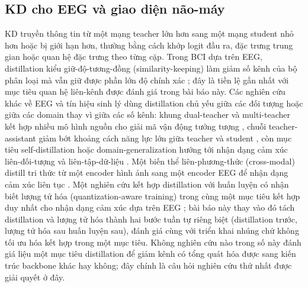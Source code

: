 \documentclass[11pt,a4paper,twoside,asymmetric]{article}
\begin{document}
\subsection{KD cho EEG và giao diện não-máy}
KD truyền thông tin từ một mạng teacher lớn hơn sang một mạng student nhỏ hơn hoặc bị giới hạn hơn, thường bằng cách khớp logit đầu ra, đặc trưng trung gian hoặc quan hệ đặc trưng theo từng cặp. Trong BCI dựa trên EEG, distillation kiểu giữ-độ-tương-đồng (similarity-keeping) làm giảm số kênh của bộ phân loại mà vẫn giữ được phần lớn độ chính xác \cite{R47}; đây là tiền lệ gần nhất với mục tiêu quan hệ liên-kênh được đánh giá trong bài báo này. Các nghiên cứu khác về EEG và tín hiệu sinh lý dùng distillation chủ yếu giữa các đối tượng hoặc giữa các domain thay vì giữa các số kênh: khung dual-teacher và multi-teacher kết hợp nhiều mô hình nguồn cho giải mã vận động tưởng tượng \cite{R49,R54}, chuỗi teacher-assistant giảm bớt khoảng cách năng lực lớn giữa teacher và student \cite{R53}, còn mục tiêu self-distillation hoặc domain-generalization hướng tới nhận dạng cảm xúc liên-đối-tượng và liên-tập-dữ-liệu \cite{R50,R52,R55,R57}. Một biến thể liên-phương-thức (cross-modal) distill tri thức từ một encoder hình ảnh sang một encoder EEG để nhận dạng cảm xúc liên tục \cite{R51}. Một nghiên cứu kết hợp distillation với huấn luyện có nhận biết lượng tử hóa (quantization-aware training) trong cùng một mục tiêu kết hợp duy nhất cho nhận dạng cảm xúc dựa trên EEG \cite{R56}; bài báo này thay vào đó tách distillation và lượng tử hóa thành hai bước tuần tự riêng biệt (distillation trước, lượng tử hóa sau huấn luyện sau), đánh giá cùng với triển khai nhúng chứ không tối ưu hóa kết hợp trong một mục tiêu. Không nghiên cứu nào trong số này đánh giá liệu một mục tiêu distillation để giảm kênh có tổng quát hóa được sang kiến trúc backbone khác hay không; đây chính là câu hỏi nghiên cứu thứ nhất được giải quyết ở đây.
\end{document}

